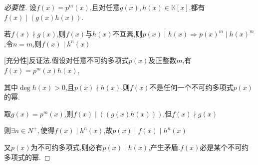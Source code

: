 \begin{proof}
    [必要性]设$f(x)=p^m(x)$,且对任意$g(x),h(x)\in\mathbb{K}[x]$,都有$f(x)\mid (g(x)h(x))$. 
    
    若$f(x)\nmid g(x)$,则$f(x)$与$h(x)$不互素,则$p(x)\mid h(x)\Longrightarrow p(x)^m \mid h(x)^m$,令$n=m$,则$f(x)\mid h^n(x)$

    [充分性]反证法.假设对任意不可约多项式$p(x)$及正整数$m$,有$f(x)=p^m(x)h(x)$,
    
    其中$\deg h(x)>0$,且$p(x)\nmid h(x)$.则$f(x)$不是任何一个不可约多项式$p(x)$的幂. 
    
    取$g(x)=p^m(x)$,则$f(x)\mid ((g(x)h(x)))$,但$f(x)\nmid g(x)$

    则$\exists n\in N^+,$使得$f(x)\mid h^n(x)$,故$p(x)\mid f(x)\mid h^n(x)$

    又$p(x)$为不可约多项式,则必有$p(x)\mid h(x)$,产生矛盾.$f(x)$必是某个不可约多项式的幂.
\end{proof}
